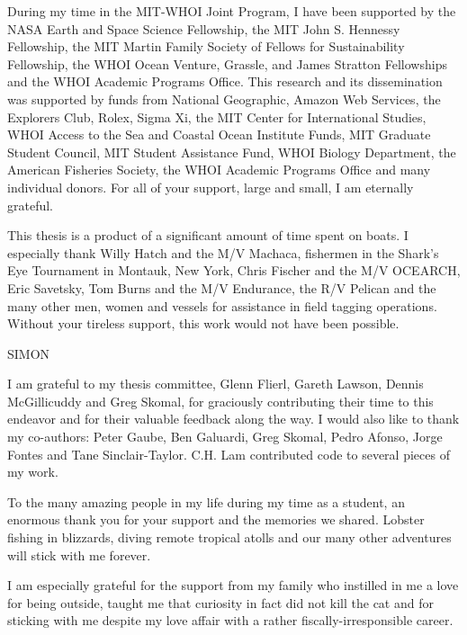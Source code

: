 {\parindent15pt

\singlespace
During my time in the MIT-WHOI Joint Program, I have been supported by the NASA Earth and Space Science Fellowship, the MIT John S. Hennessy Fellowship, the MIT Martin Family Society of Fellows for Sustainability Fellowship, the WHOI Ocean Venture, Grassle, and James Stratton Fellowships and the WHOI Academic Programs Office. This research and its dissemination was supported by funds from National Geographic, Amazon Web Services, the Explorers Club, Rolex, Sigma Xi, the MIT Center for International Studies, WHOI Access to the Sea and Coastal Ocean Institute Funds, MIT Graduate Student Council, MIT Student Assistance Fund, WHOI Biology Department, the American Fisheries Society, the WHOI Academic Programs Office and many individual donors. For all of your support, large and small, I am eternally grateful. \par\bigskip

This thesis is a product of a significant amount of time spent on boats. I especially thank Willy Hatch and the M/V Machaca, fishermen in the Shark's Eye Tournament in Montauk, New York, Chris Fischer and the M/V OCEARCH, Eric Savetsky, Tom Burns and the M/V Endurance, the R/V Pelican and the many other men, women and vessels for assistance in field tagging operations. Without your tireless support, this work would not have been possible.

SIMON

I am grateful to my thesis committee, Glenn Flierl, Gareth Lawson, Dennis McGillicuddy and Greg Skomal, for graciously contributing their time to this endeavor and for their valuable feedback along the way. I would also like to thank my co-authors: Peter Gaube, Ben Galuardi, Greg Skomal, Pedro Afonso, Jorge Fontes and Tane Sinclair-Taylor. C.H. Lam contributed code to several pieces of my work.

To the many amazing people in my life during my time as a student, an enormous thank you for your support and the memories we shared. Lobster fishing in blizzards, diving remote tropical atolls and our many other adventures will stick with me forever.

I am especially grateful for the support from my family who instilled in me a love for being outside, taught me that curiosity in fact did not kill the cat and for sticking with me despite my love affair with a rather fiscally-irresponsible career.


}
 


